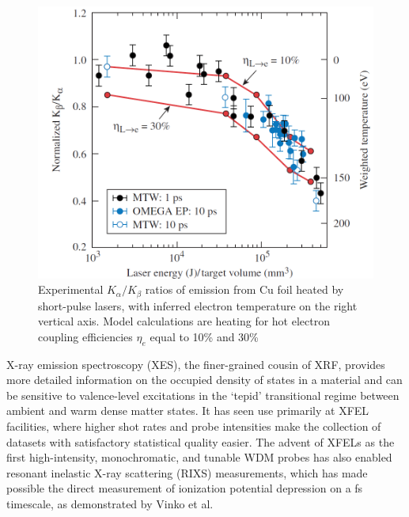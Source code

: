 \documentclass [11pt, proquest, article] {uwthesis}[2016/11/22]
\begin{document}
\begin{figure}[h] 
\caption{Experimental $K_\alpha/K_\beta$ ratios of emission from Cu foil heated by short-pulse lasers, with inferred electron temperature on the right vertical axis. Model calculations are heating for hot electron coupling efficiencies $\eta_e$ equal to 10\% and 30\% \cite{nilson2010scaling}}
\label{fig:nilson}
\centering
\includegraphics[scale=0.5]{../Figures/nilson_branching.png}
\end{figure}

X-ray emission spectroscopy (XES), the finer-grained cousin of XRF, provides more detailed information on the occupied density of states in a material and can be sensitive to valence-level excitations in the `tepid' transitional regime between ambient and warm dense matter states. \cite{zastrau2008bremsstrahlung} It has seen use primarily at XFEL facilities, where higher shot rates and probe intensities make the collection of datasets with satisfactory statistical quality easier.\cite{kupitz2014serial} The advent of XFELs as the first high-intensity, monochromatic, and tunable WDM probes has also enabled resonant inelastic X-ray scattering (RIXS) measurements, which has made possible the direct measurement of ionization potential depression on a fs timescale, as demonstrated by Vinko et al.\cite{vinko2012creation, ciricosta2012direct}

\end{document}
